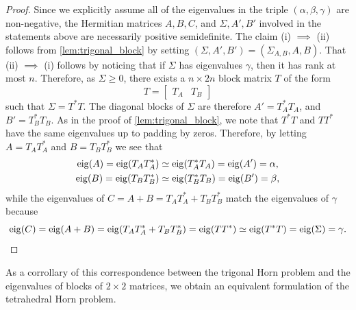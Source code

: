 \documentclass[notitlepage, 10pt]{article}
\begin{document}
\begin{proof}
    Since we explicitly assume all of the eigenvalues in the triple $(\alpha,\beta,\gamma)$ are non-negative, the Hermitian matrices $A,B,C$, and $\Sigma,A',B'$ involved in the statements above are necessarily positive semidefinite.
    The claim (i) $\implies$ (ii) follows from \cref{lem:trigonal_block} by setting $(\Sigma, A', B') = (\Sigma_{A,B}, A, B)$.
    That (ii) $\implies$ (i) follows by noticing that if $\Sigma$ has eigenvalues $\gamma$, then it has rank at most $n$.
    Therefore, as $\Sigma \geq 0$, there exists a $n\times 2n$ block matrix $T$ of the form
    \begin{equation}
        T = \begin{bmatrix} T_{A} & T_{B} \end{bmatrix} 
    \end{equation}
    such that $\Sigma = T^{*} T$. 
    The diagonal blocks of $\Sigma$ are therefore $A' = T_{A}^*T_{A}$, and $B' = T_{B}^{*}T_{B}$.
    As in the proof of \cref{lem:trigonal_block}, we note that $T^{*}T$ and $TT^{*}$ have the same eigenvalues up to padding by zeros.
    Therefore, by letting $A = T_{A} T_{A}^{*}$ and $B = T_{B} T_{B}^*$ we see that 
    \begin{align}
        \begin{split}
            \operatorname{eig}(A) = \operatorname{eig}(T_{A} T_{A}^{*}) &\simeq \operatorname{eig}(T_{A}^{*} T_{A}) = \operatorname{eig}(A') = \alpha, \\
            \operatorname{eig}(B) = \operatorname{eig}(T_{B} T_{B}^{*}) &\simeq \operatorname{eig}(T_{B}^{*} T_{B}) = \operatorname{eig}(B') = \beta,
        \end{split}
    \end{align}
    while the eigenvalues of $C = A+B = T_{A} T_{A}^{*} + T_{B} T_{B}^*$ match the eigenvalues of $\gamma$ because
    \begin{equation}
        \operatorname{eig}(C) = \operatorname{eig}(A+B) =\operatorname{eig}(T_{A} T_{A}^{*} + T_{B} T_{B}^*) = \operatorname{eig}(T T^{*}) \simeq \operatorname{eig}(T^{*}T) = \operatorname{eig}(\Sigma) = \gamma.
    \end{equation}
\end{proof}

As a corrollary of this correspondence between the trigonal Horn problem and the eigenvalues of blocks of $2\times 2$ matrices, we obtain an equivalent formulation of the tetrahedral Horn problem.
\end{document}
